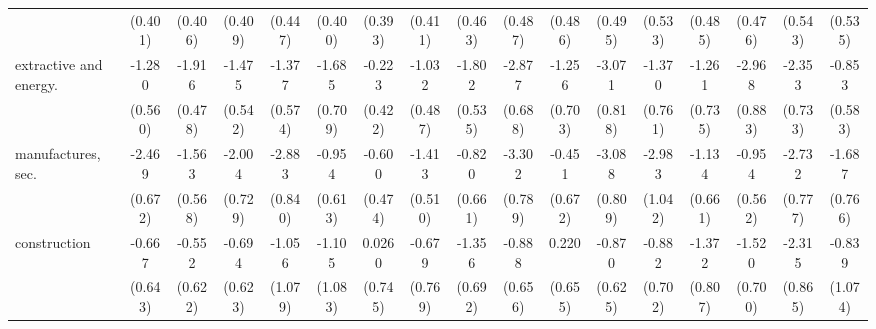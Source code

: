 {\begin{tabular}{l*{16}{c}}
                    &     (0.401)         &     (0.406)         &     (0.409)         &     (0.447)         &     (0.400)         &     (0.393)         &     (0.411)         &     (0.463)         &     (0.487)         &     (0.486)         &     (0.495)         &     (0.533)         &     (0.485)         &     (0.476)         &     (0.543)         &     (0.535)         \\
[1em]
extractive and energy.&      -1.280\sym{*}  &      -1.916\sym{***}&      -1.475\sym{**} &      -1.377\sym{*}  &      -1.685\sym{*}  &      -0.223         &      -1.032\sym{*}  &      -1.802\sym{***}&      -2.877\sym{***}&      -1.256         &      -3.071\sym{***}&      -1.370         &      -1.261         &      -2.968\sym{***}&      -2.353\sym{**} &      -0.853         \\
                    &     (0.560)         &     (0.478)         &     (0.542)         &     (0.574)         &     (0.709)         &     (0.422)         &     (0.487)         &     (0.535)         &     (0.688)         &     (0.703)         &     (0.818)         &     (0.761)         &     (0.735)         &     (0.883)         &     (0.733)         &     (0.583)         \\
[1em]
manufactures, sec.  &      -2.469\sym{***}&      -1.563\sym{**} &      -2.004\sym{**} &      -2.883\sym{***}&      -0.954         &      -0.600         &      -1.413\sym{**} &      -0.820         &      -3.302\sym{***}&      -0.451         &      -3.088\sym{***}&      -2.983\sym{**} &      -1.134         &      -0.954         &      -2.732\sym{***}&      -1.687\sym{*}  \\
                    &     (0.672)         &     (0.568)         &     (0.729)         &     (0.840)         &     (0.613)         &     (0.474)         &     (0.510)         &     (0.661)         &     (0.789)         &     (0.672)         &     (0.809)         &     (1.042)         &     (0.661)         &     (0.562)         &     (0.777)         &     (0.766)         \\
[1em]
construction        &      -0.667         &      -0.552         &      -0.694         &      -1.056         &      -1.105         &      0.0260         &      -0.679         &      -1.356         &      -0.888         &       0.220         &      -0.870         &      -0.882         &      -1.372         &      -1.520\sym{*}  &      -2.315\sym{**} &      -0.839         \\
                    &     (0.643)         &     (0.622)         &     (0.623)         &     (1.079)         &     (1.083)         &     (0.745)         &     (0.769)         &     (0.692)         &     (0.656)         &     (0.655)         &     (0.625)         &     (0.702)         &     (0.807)         &     (0.700)         &     (0.865)         &     (1.074)         \\

\end{tabular}}
